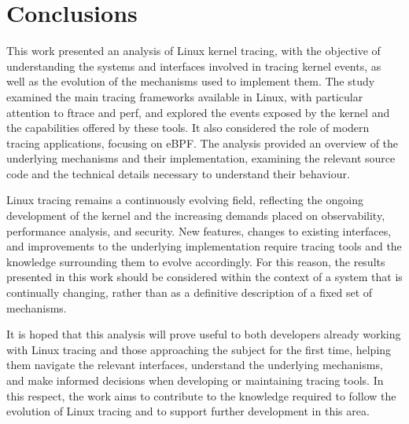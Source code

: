 \chapter{Conclusions}
\label{cha:conclusions}

This work presented an analysis of Linux kernel tracing, with the objective of
understanding the systems and interfaces involved in tracing kernel events, as
well as the evolution of the mechanisms used to implement them. The study
examined the main tracing frameworks available in Linux, with particular
attention to ftrace and perf, and explored the events exposed by the kernel and
the capabilities offered by these tools. It also considered the role of modern
tracing applications, focusing on eBPF. The analysis provided an overview of the
underlying mechanisms and their implementation, examining the relevant source
code and the technical details necessary to understand their behaviour.

Linux tracing remains a continuously evolving field, reflecting the ongoing
development of the kernel and the increasing demands placed on observability,
performance analysis, and security. New features, changes to existing
interfaces, and improvements to the underlying implementation require tracing
tools and the knowledge surrounding them to evolve accordingly. For this reason,
the results presented in this work should be considered within the context of a
system that is continually changing, rather than as a definitive description of
a fixed set of mechanisms.

It is hoped that this analysis will prove useful to both developers already
working with Linux tracing and those approaching the subject for the first time,
helping them navigate the relevant interfaces, understand the underlying
mechanisms, and make informed decisions when developing or maintaining tracing
tools. In this respect, the work aims to contribute to the knowledge required to
follow the evolution of Linux tracing and to support further development in this
area.
